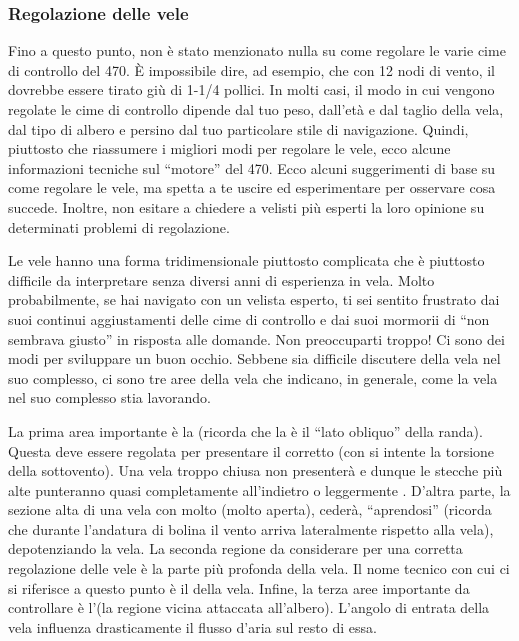 \subsubsection{Regolazione delle vele}
\label{subsubsec:RegolazioneDelleVele}
Fino a questo punto, non è stato menzionato nulla su come regolare le varie cime
di controllo del 470. È impossibile dire, ad esempio, che con 12 nodi di vento,
il \cunningham dovrebbe essere tirato giù di 1-1/4 pollici. In molti casi, il
modo in cui vengono regolate le cime di controllo dipende dal tuo peso, dall'età
e dal taglio della vela, dal tipo di albero e persino dal tuo particolare stile
di navigazione. Quindi, piuttosto che riassumere i migliori modi per regolare le
vele, ecco alcune informazioni tecniche sul ``motore'' del 470. Ecco alcuni
suggerimenti di base su come regolare le vele, ma spetta a te uscire ed
esperimentare per osservare cosa succede. Inoltre, non esitare a chiedere a
velisti più esperti la loro opinione su determinati problemi di regolazione.

Le vele hanno una forma tridimensionale piuttosto complicata che è piuttosto
difficile da interpretare senza diversi anni di esperienza in vela. Molto
probabilmente, se hai navigato con un velista esperto, ti sei sentito frustrato
dai suoi continui aggiustamenti delle cime di controllo e dai suoi mormorii di
``non sembrava giusto'' in risposta alle domande. Non preoccuparti troppo! Ci
sono dei modi per sviluppare un buon occhio. Sebbene sia difficile discutere
della vela nel suo complesso, ci sono tre aree della vela che indicano, in
generale, come la vela nel suo complesso stia lavorando.

La prima area importante è la \upperleech (ricorda che la \leech è il ``lato
obliquo'' della randa). Questa deve essere regolata per presentare il corretto
\twist (con \twist si intente la torsione della \leech sottovento). Una vela
troppo chiusa non presenterà \twist e dunque le stecche più alte punteranno
quasi completamente all'indietro o leggermente \windward. D'altra parte, la
sezione alta di una vela con molto \twist (molto aperta), cederà, ``aprendosi''
\leeward (ricorda che durante l'andatura di bolina il vento arriva lateralmente
rispetto alla vela), depotenziando la vela.
%
La seconda regione da considerare per una corretta regolazione delle vele è la
parte più profonda della vela. Il nome tecnico con cui ci si riferisce a questo
punto è il \emph{\draft} della vela.
%
Infine, la terza aree importante da controllare è l'\luff (la regione vicina
attaccata all'albero). L'angolo di entrata della vela influenza drasticamente il
flusso d'aria sul resto di essa.

